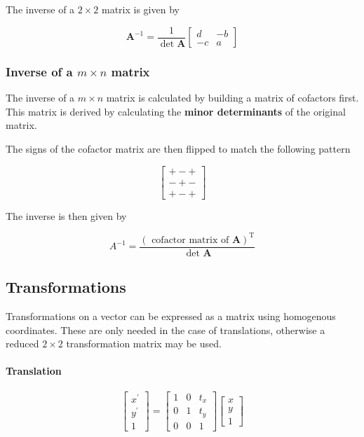The inverse of a \(2 \times 2\) matrix is given by

\begin{equation}
	\mathbf{A}^{-1}=\frac{1}{\det \mathbf{A}}\left[\begin{array}{rr}{d} & {-b} \\ {-c} & {a}\end{array}\right]
\end{equation}

\subsubsection{Inverse of a \texorpdfstring{\( m \times n \)}{2 by 2} matrix}
The inverse of a \(m\times n\) matrix is calculated by building a matrix of cofactors first. This matrix is derived by calculating the \textbf{minor determinants} of the original matrix.

The signs of the cofactor matrix are then flipped to match the following pattern

\begin{equation}
	\left[\begin{array}{l}{+-+} \\ {-+-} \\ {+-+}\end{array}\right]
\end{equation}

The inverse is then given by

\begin{equation}
	A^{-1}=\frac{{(\text { cofactor matrix of } \mathbf{A})}^{\mathrm{T}}}{\text { det } \mathbf{A}}
\end{equation}

\subsection{Transformations}
Transformations on a vector can be expressed as a matrix using homogenous coordinates. These are only needed in the case of translations, otherwise a reduced \(2 \times 2\) transformation matrix may be used.

\paragraph{Translation}

\begin{equation}
	\left[\begin{array}{l}{x^{\prime}} \\ {y^{\prime}} \\ {1}\end{array}\right]=\left[\begin{array}{lll}{1} & {0} & {t_{x}} \\ {0} & {1} & {t_{y}} \\ {0} & {0} & {1}\end{array}\right]\left[\begin{array}{l}{x} \\ {y} \\ {1}\end{array}\right]
\end{equation}

